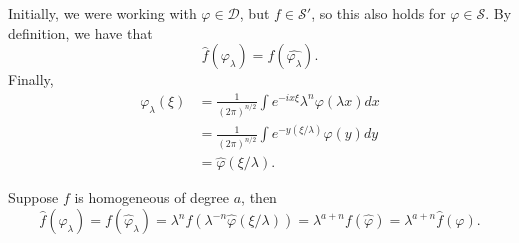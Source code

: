 \documentclass[12pt]{scrartcl}
\renewcommand{\hat}{\widehat}
\let \phi \varphi
\begin{document}
Initially, we were working with $\phi \in \mathcal D$, but $f \in \mathcal S'$, so this also holds for $\phi \in \mathcal S$.  
By definition, we have that
$$\hat{f}(\phi_\lambda) = f(\hat{\phi_\lambda}).$$
Finally,
\begin{align*}
\hat{\phi_\lambda}(\xi) &= \frac{1}{(2\pi)^{n/2}}\int e^{-ix\xi} \lambda^n \phi(\lambda x)dx \\
&=\frac{1}{(2\pi)^{n/2}} \int e^{-y(\xi/\lambda)}\phi(y)dy \\
&= \hat{\phi}(\xi/\lambda).
\end{align*}

Suppose $f$ is homogeneous of degree $a$, then
$$\hat{f}(\phi_\lambda) = f(\hat{\phi}_\lambda) = \lambda^nf(\lambda^{-n}\hat{\phi}(\xi/\lambda)) = \lambda^{a+n}f(\hat{\phi}) = \lambda^{a+n} \hat{f}(\phi).$$
\end{document}
